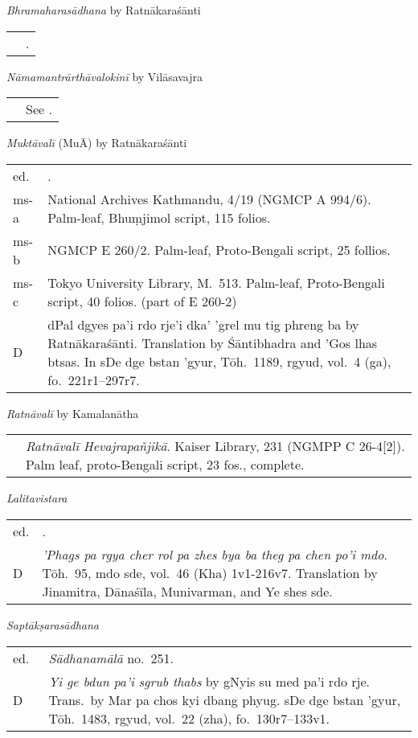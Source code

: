 \documentclass[12pt,twoside]{article}
\newcommand{\mybibexclude}[1]{\addtocategory{fullcited}{#1}}
\begin{document}
\noindent\emph{Bhramaharasādhana} by Ratnākaraśānti
\noindent\begin{longtable}{ p{} p{} }
	& \fullcite*{isaacson2002}.\mybibexclude{isaacson2002} 
\end{longtable}

\noindent\emph{Nāmamantrārthāvalokinī} by Vilāsavajra
\noindent\begin{longtable}{ p{} p{} }
	& See \textcite{tribe2016}.
\end{longtable}

\noindent\emph{Muktāvalī} (MuĀ) by Ratnākaraśānti
\noindent\begin{longtable}{ p{} p{} }
	ed. & \fullcite*{tripathi2001}.\mybibexclude{tripathi2001} \\
	ms-a & National Archives Kathmandu, 4/19 (NGMCP A 994/6). Palm-leaf, Bhuṃjimol script, 115 folios.\\
	ms-b & NGMCP E 260/2. Palm-leaf, Proto-Bengali script, 25 follios. \\
	ms-c & Tokyo University Library, M.\ 513. Palm-leaf, Proto-Bengali script, 40 folios. (part of E 260-2) \\
	D & dPal dgyes pa'i rdo rje'i dka' 'grel mu tig phreng ba by Ratnākaraśānti. Translation by Śāntibhadra and 'Gos lhas btsas. In sDe dge bstan 'gyur, Tōh.\ 1189, rgyud, vol.\ 4 (ga), fo.\ 221r1–297r7. 
\end{longtable}

\noindent\emph{Ratnāvalī} by Kamalanātha 
\noindent\begin{longtable}{ p{} p{} }
	&  \emph{Ratnāvalī Hevajrapañjikā}. Kaiser Library, 231 (NGMPP C 26-4[2]). Palm leaf, proto-Bengali script, 23 fos., complete. 
\end{longtable}

\noindent\emph{Lalitavistara}
\noindent\begin{longtable}{ p{} p{} }
	ed. & \fullcite*{lefmann1902}.\mybibexclude{lefmann1902} \\ 
	D & \emph{'Phags pa rgya cher rol pa zhes bya ba theg pa chen po'i mdo}. Tōh.\ 95, mdo sde, vol.\ 46 (Kha) 1v1-216v7. Translation by Jinamitra, Dānaśīla, Munivarman, and Ye shes sde.

\end{longtable}

\noindent\emph{Saptākṣarasādhana} 
\noindent\begin{longtable}{ p{} p{} }
	ed.\ & \emph{Sādhanamālā} no.\ 251. \\
	D & \emph{Yi ge bdun pa'i sgrub thabs} by gNyis su med pa'i rdo rje. Trans.\ by Mar pa chos kyi dbang phyug. sDe dge bstan 'gyur, Tōh.\ 1483, rgyud, vol.\ 22 (zha), fo.\ 130r7–133v1. 
\end{longtable}
\end{document}
